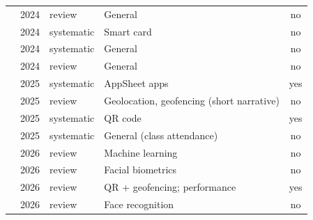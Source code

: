 \begin{table}[tbp]
\begin{tabular}{@{}L{3.3cm}llL{4.0cm}c@{}}
\cite{anon2024review} & 2024 & review & General & no \\
\cite{muslim2024smart} & 2024 & systematic & Smart card & no \\
\cite{shrivastav2024systematic} & 2024 & systematic & General & no \\
\cite{x2024comprehensive} & 2024 & review & General & no \\
\cite{dliyaulhaq2025systematic} & 2025 & systematic & AppSheet apps & yes \\
\cite{gupta2025geolocation} & 2025 & review & Geolocation, geofencing (short narrative) & no \\
\cite{jodihendrawan2025code} & 2025 & systematic & QR code & yes \\
\cite{x2025which} & 2025 & systematic & General (class attendance) & no \\
\cite{chakraborty2026comprehensive} & 2026 & review & Machine learning & no \\
\cite{fatikha2026utilization} & 2026 & review & Facial biometrics & no \\
\cite{ohal2026review} & 2026 & review & QR + geofencing; performance & yes \\
\cite{patel2026comprehensive} & 2026 & review & Face recognition & no \\
\bottomrule\end{tabular}\end{table}

